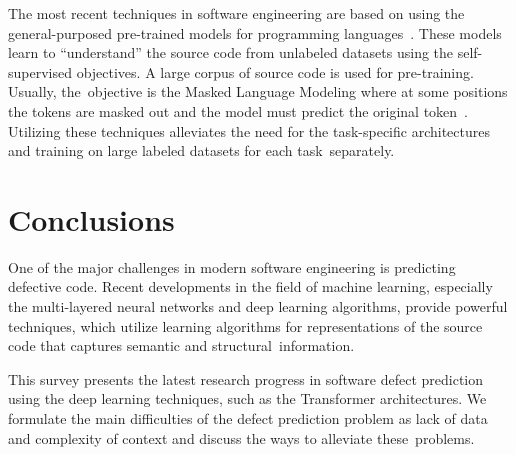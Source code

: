 \documentclass[mathematics,review,accept,moreauthors,pdftex]{Definitions/mdpi}
\begin{document}
\begin{paracol}{2}
The most recent techniques in software engineering are based on using the general-purposed pre-trained models for programming languages~\cite{karampatsis2020scelmo,guo2021graphcodebert}. These models learn to ``understand'' the source code from unlabeled datasets using the self-supervised objectives. A large corpus of source code is used for pre-training. Usually, the~objective is the Masked Language Modeling where at some positions the tokens are masked out and the model must predict the original token~\cite{FengEtAl2020}. 
Utilizing these techniques alleviates the need for the task-specific architectures and training on large labeled datasets for each task~separately.


\section{Conclusions} \label{sec_6}

One of the major challenges in modern software engineering is predicting defective code. Recent developments in the field of machine learning, especially the multi-layered neural networks and deep learning algorithms, provide powerful techniques, which utilize learning algorithms for representations of the source code that captures semantic and structural~information. 

This survey presents the latest research progress in software defect prediction using the deep learning techniques, such as the Transformer architectures. We formulate the main difficulties of the defect prediction problem as lack of data and complexity of context and discuss the ways to alleviate these~problems.


\end{paracol}
\end{document}
